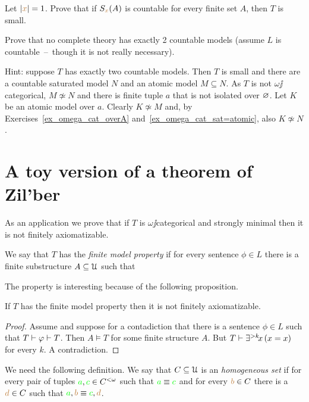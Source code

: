 \documentclass[creche.tex]{subfiles}
\begin{document}
\begin{exercise}
Let $|{\color{brown} x}|=1$.
Prove that if $S_{{\color{brown} x}}(A)$ is countable for every finite set $A$, then $T$ is small.\QED
\end{exercise}


\begin{exercise}[(Vaught)]
Prove that no complete theory has exactly 2 countable models (assume $L$ is countable~--~though it is not really necessary).

Hint: suppose $T$ has exactly two countable models.
Then $T$ is small and there are a countable saturated model $N$ and an atomic model $M\subseteq N$.
As $T$ is not $\omega\jj$categorical, $M\not\simeq N$ and there is finite tuple $a$ that is not isolated over $\varnothing$.
Let $K$ be an atomic model over $a$.
Clearly $K\not\simeq M$ and, by Exercises~\ref{ex_omega_cat_overA} and~\ref{ex_omega_cat_sat=atomic}, also $K\not\simeq N$.\QED
\end{exercise}

\section{A toy version of a theorem of Zil'ber}

As an application we prove that if $T$ is $\omega\jj$categorical and strongly minimal then it is not finitely axiomatizable.

We say that $T$ has the \emph{finite model property\/} if for every sentence $\phi\in L$ there is a finite substructure $A\subseteq\EuScript U$ such that 


The property is interesting because of the following proposition.

\begin{proposition}\label{prop_fmp_fa}
If $T$ has the finite model property then it is not finitely axiomatizable.
\end{proposition}
\begin{proof}
Assume  and suppose for a contadiction that there is a sentence $\phi\in L$ such that $T\vdash\varphi\vdash T$.
Then $A\models T$ for some finite structure $A$.
But $T\vdash \exists^{>k}\!x\,(x=x)$ for every $k$.
A contradiction.
\end{proof}
We need the following definition.
We say that $C\subseteq\EuScript U$ is an \emph{homogeneous set\/} if for every pair of tuples  ${\color{green} a},{\color{green} c}\in C^{<\omega}$ such that ${\color{green} a}\equiv{\color{green}c}$ and for every ${\color{brown} b}\in C$ there is a ${\color{brown} d}\in C$ such that ${\color{green} a},{\color{brown} b}\equiv {\color{green}c},{\color{brown} d}$.
\end{document}
